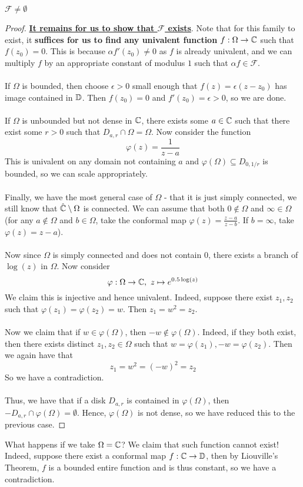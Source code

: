 \begin{proposition}
    $\mathcal{F} \neq \emptyset$
\end{proposition}

\begin{proof}
    \ul{\textbf{It remains for us to show that $\mathcal{F}$ exists}}. Note that for this family to exist, it \textbf{suffices for us to find any univalent function $f: \Omega \to \mathbb{C}$} such that $f(z_0) = 0$. This is because $\alpha f'(z_0) \neq 0$ as $f$ is already univalent, and we can multiply $f$ by an appropriate constant of modulus $1$ such that $\alpha f \in \mathcal{F}$.\\\\
    If $\Omega$ is bounded, then choose $\epsilon > 0$ small enough that $f(z) = \epsilon (z - z_0)$ has image contained in $\mathbb{D}$. Then $f(z_0) = 0$ and $f'(z_0) = \epsilon > 0$, so we are done.\\\\
    If $\Omega$ is unbounded but not dense in $\mathbb{C}$, there exists some $a \in \mathbb{C}$ such that there exist some $r > 0$ such that $D_{a, r} \cap \Omega = \Omega$. Now consider the function
    \[\varphi(z) = \frac{1}{z - a}\]
    This is univalent on any domain not containing $a$ and $\varphi(\Omega) \subseteq D_{0, 1/r}$ is bounded, so we can scale appropriately.\\\\
    Finally, we have the most general case of $\Omega$ - that it is just simply connected, we still know that $\hat{\mathbb{C}} \setminus \Omega$ is connected. We can assume that both $0 \notin \Omega$ and $\infty \in \Omega$ (for any $a \notin \Omega$ and $b \in \Omega$, take the conformal map $\varphi(z) = \frac{z - a}{z - b}$. If $b = \infty$, take $\varphi(z) = z - a$).\\\\
    Now since $\Omega$ is simply connected and does not contain $0$, there exists a branch of $\log(z)$ in $\Omega$. Now consider
    \[\varphi: \Omega \to \mathbb{C},\ z \mapsto e^{0.5\log(z)}\]
    We claim this is injective and hence univalent. Indeed, suppose there exist $z_1, z_2$ such that $\varphi(z_1) = \varphi(z_2) = w$. Then $z_1 = w^2 = z_2$.\\\\
    Now we claim that if $w \in \varphi(\Omega)$, then $-w \notin \varphi(\Omega)$. Indeed, if they both exist, then there exists distinct $z_1, z_2 \in \Omega$ such that $w = \varphi(z_1), -w = \varphi(z_2)$. Then we again have that
    \[z_1 = w^2 = (-w)^2 = z_2\]
    So we have a contradiction.\\\\
    Thus, we have that if a disk $D_{a, r}$ is contained in $\varphi(\Omega)$, then $-D_{a, r} \cap \varphi(\Omega) = \emptyset$. Hence, $\varphi(\Omega)$ is not dense, so we have reduced this to the previous case.
\end{proof}

\begin{remark}
    What happens if we take $\Omega = \mathbb{C}$? We claim that such function cannot exist! Indeed, suppose there exist a conformal map $f: \mathbb{C} \to \mathbb{D}$, then by Liouville's Theorem, $f$ is a bounded entire function and is thus constant, so we have a contradiction.
\end{remark}